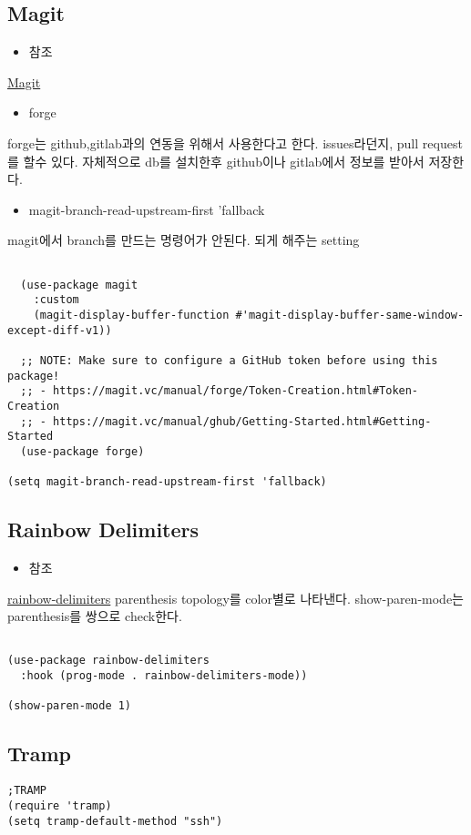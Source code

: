 \documentclass[11pt]{article}
\begin{document}
\subsection*{Magit}
\label{sec:org09546c0}
\begin{itemize}
\item 참조
\end{itemize}
\href{https://magit.vc/}{Magit} 
\begin{itemize}
\item forge
\end{itemize}
forge는 github,gitlab과의 연동을 위해서 사용한다고 한다. issues라던지, pull request를 할수 있다. 자체적으로 db를 설치한후 github이나 gitlab에서 정보를 받아서 저장한다.
\begin{itemize}
\item magit-branch-read-upstream-first 'fallback
\end{itemize}
magit에서 branch를 만드는 명령어가 안된다. 되게 해주는 setting
\begin{verbatim}

  (use-package magit
    :custom
    (magit-display-buffer-function #'magit-display-buffer-same-window-except-diff-v1))

  ;; NOTE: Make sure to configure a GitHub token before using this package!
  ;; - https://magit.vc/manual/forge/Token-Creation.html#Token-Creation
  ;; - https://magit.vc/manual/ghub/Getting-Started.html#Getting-Started
  (use-package forge)

(setq magit-branch-read-upstream-first 'fallback)
\end{verbatim}

\subsection*{Rainbow Delimiters}
\label{sec:org1774391}

\begin{itemize}
\item 참조
\end{itemize}
\href{https://github.com/Fanael/rainbow-delimiters}{rainbow-delimiters} 
parenthesis topology를 color별로 나타낸다.
show-paren-mode는 parenthesis를 쌍으로 check한다.
\begin{verbatim}

(use-package rainbow-delimiters
  :hook (prog-mode . rainbow-delimiters-mode))

(show-paren-mode 1)
\end{verbatim}

\subsection*{Tramp}
\label{sec:orgf34c121}
\begin{verbatim}
;TRAMP
(require 'tramp)
(setq tramp-default-method "ssh")
\end{verbatim}
\end{document}
